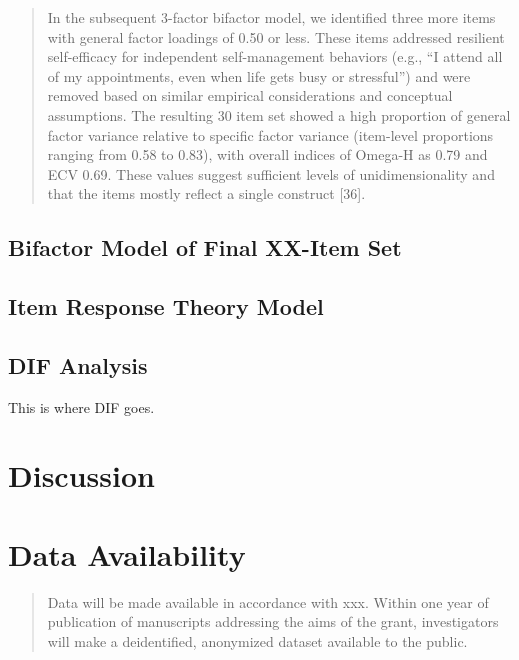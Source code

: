\documentclass[
]{article}
\begin{document}
\begin{quote}
In the subsequent 3-factor bifactor model, we identified three more items with general factor loadings of 0.50 or less. These items addressed resilient self-efficacy for independent self-management behaviors (e.g., ``I attend all of my appointments, even when life gets busy or stressful'') and were removed based on similar empirical considerations and conceptual assumptions. The resulting 30 item set showed a high proportion of general factor variance relative to specific factor variance (item-level proportions ranging from 0.58 to 0.83), with overall indices of Omega-H as 0.79 and ECV 0.69. These values suggest sufficient levels of unidimensionality and that the items mostly reflect a single construct {[}36{]}.
\end{quote}

\hypertarget{bifactor-model-of-final-xx-item-set}{%
\subsection{Bifactor Model of Final XX-Item Set}\label{bifactor-model-of-final-xx-item-set}}

\hypertarget{item-response-theory-model}{%
\subsection{Item Response Theory Model}\label{item-response-theory-model}}

\hypertarget{dif-analysis}{%
\subsection{DIF Analysis}\label{dif-analysis}}

This is where DIF goes.

\hypertarget{discussion}{%
\section{Discussion}\label{discussion}}

\hypertarget{data-availability}{%
\section{Data Availability}\label{data-availability}}

\begin{quote}
Data will be made available in accordance with xxx. Within one year of publication of manuscripts addressing the aims of the grant, investigators will make a deidentified, anonymized dataset available to the public.
\end{quote}
\end{document}
